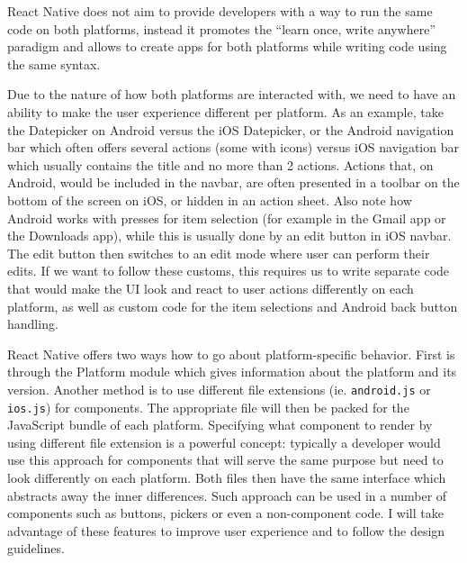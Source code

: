 React Native does not aim to provide developers with a way to run the same code on both platforms, instead it promotes the “learn once, write anywhere” paradigm and allows to create apps for both platforms while writing code using the same syntax.


Due to the nature of how both platforms are interacted with, we need to have an ability to make the user experience different per platform. As an example, take the Datepicker on Android versus the iOS Datepicker, or the Android navigation bar which often offers several actions (some with icons) versus iOS navigation bar which usually contains the title and no more than 2 actions. 
Actions that, on Android, would be included in the navbar, are often presented in a toolbar on the bottom of the screen on iOS, or hidden in an action sheet. Also note how Android works with presses for item selection (for example in the Gmail app or the Downloads app), while this is usually done by an edit button in iOS navbar. The edit button then switches to an edit mode where user can perform their edits. If we want to follow these customs, this requires us to write separate code that would make the UI look and react to user actions differently on each platform, as well as custom code for the item selections and Android back button handling.


React Native offers two ways how to go about platform-specific behavior. First is through the Platform module which gives information about the platform and its version. Another method is to use different file extensions (ie. \texttt{android.js} or \texttt{ios.js}) for components. The appropriate file will then be packed for the JavaScript bundle of each platform. Specifying what component to render by using different file extension is a powerful concept: typically a developer would use this approach for components that will serve the same purpose but need to look differently on each platform. Both files then have the same interface which abstracts away the inner differences. Such approach can be used in a number of components such as buttons, pickers or even a non-component code. I will take advantage of these features to improve user experience and to follow the design guidelines.


